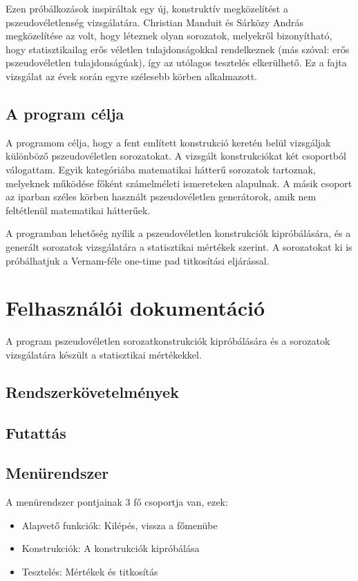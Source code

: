\documentclass[12pt]{article}
\begin{document}
	\par
	Ezen próbálkozások inspiráltak egy új, konstruktív megközelítést a pszeudovéletlenség vizsgálatára. Christian Manduit és Sárközy András megközelítése az volt, hogy léteznek olyan sorozatok, melyekről bizonyítható, hogy statisztikailag erős véletlen tulajdonságokkal rendelkeznek (más szóval: erős pszeudovéletlen tulajdonságúak), így az utólagos tesztelés elkerülhető. Ez a fajta vizsgálat az évek során egyre szélesebb körben alkalmazott.
	\subsection{A program célja}
	A programom célja, hogy a fent említett konstrukció keretén belül vizsgáljak különböző pszeudovéletlen sorozatokat. A vizsgált konstrukciókat két csoportból válogattam. Egyik kategóriába matematikai hátterű sorozatok tartoznak, melyeknek működése főként számelméleti ismereteken alapulnak. A másik csoport az iparban széles körben használt pszeudovéletlen generátorok, amik nem feltétlenül matematikai hátterűek.
	\par
	A programban lehetőség nyílik a pszeudovéletlen konstrukciók kipróbálására, és a generált sorozatok vizsgálatára a statisztikai mértékek szerint. A sorozatokat ki is próbálhatjuk a Vernam-féle one-time pad titkosítási eljárással.
	\section{Felhasználói dokumentáció}
	A program pszeudovéletlen sorozatkonstrukciók kipróbálására és a sorozatok vizsgálatára készült a statisztikai mértékekkel.
	\subsection{Rendszerkövetelmények}
	\subsection{Futattás}
	\subsection{Menürendszer}
	A menürendszer pontjainak 3 fő csoportja van, ezek:
	\begin{itemize}
		\item Alapvető funkciók: Kilépés, vissza a főmenübe
		\item Konstrukciók: A konstrukciók kipróbálása
		\item Tesztelés: Mértékek és titkosítás
	\end{itemize}
\end{document}
